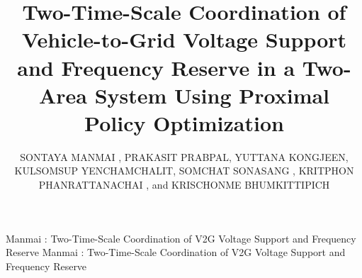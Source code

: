 \documentclass{ieeeaccess}
\begin{document}

\title{Two-Time-Scale Coordination of Vehicle-to-Grid Voltage Support and Frequency Reserve in a Two-Area System Using Proximal Policy Optimization}

\author{
\uppercase{Sontaya Manmai}
,
\uppercase{Prakasit Prabpal},
\uppercase{Yuttana Kongjeen},
\uppercase{Kulsomsup Yenchamchalit},
\uppercase{Somchat Sonasang}
,
\uppercase{Kritphon Phanrattanachai}
, and
\uppercase{Krischonme Bhumkittipich}
}

\address[1]{Department of Electrical Engineering, Faculty of Engineering,
Rajamangala University of Technology Thanyaburi,
Pathum Thani 12110, Thailand
(e-mail: sontaya\_m@mail.rmutt.ac.th; krischonme.b@en.rmutt.ac.th)}
\address[2]{Department of Electrical Technology,
Udon Thani Technical College,
Institute of Vocational Education Northeastern Region 1,
Udon Thani 41000, Thailand
(e-mail: prakasit.pra@udontech.ac.th)}
\address[3]{Intelligent Power System and Energy Research (IPER),
Department of Electrical Engineering,
Faculty of Engineering and Technology,
Rajamangala University of Technology Isan,
Nakhon Ratchasima 30000, Thailand
(e-mail: yuttana.ko@rmuti.ac.th)}
\address[4]{Department of Electrical Industrial Technology,
Faculty of Industrial Technology,
Thepsatri Rajabhat University,
Lopburi 15000, Thailand
(e-mail: kulsomsap.y@lawasri.tru.ac.th)}
\address[5]{Electrical Elements and Wireless Devices Unit (EEWDU),
Faculty of Industrial Technology,
Nakhon Phanom University,
Nakhon Phanom 48000, Thailand
(e-mail: somchat.s@npu.ac.th)}
\address[6]{Department of Electronics and Automation Engineering,
Faculty of Agricultural and Industrial Technology,
Phetchabun Rajabhat University,
Phetchabun 67000, Thailand
(e-mail: kritphon.ai@pcru.ac.th)}



\markboth
{Manmai \headeretal: Two-Time-Scale Coordination of V2G Voltage Support and Frequency Reserve}
{Manmai \headeretal: Two-Time-Scale Coordination of V2G Voltage Support and Frequency Reserve}



\titlepgskip=-21pt
\maketitle








\EOD
\end{document}
